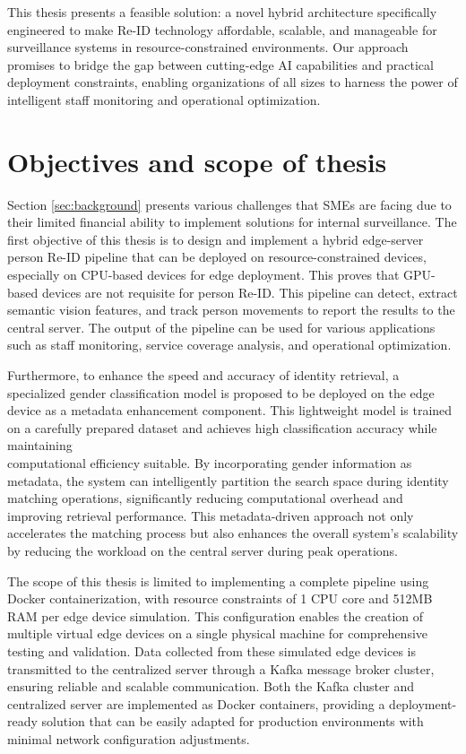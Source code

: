\documentclass[../main.tex]{subfiles}
\begin{document}
This thesis presents a feasible solution: a novel hybrid architecture specifically engineered to make Re-ID technology affordable, scalable, and manageable for surveillance systems in resource-constrained environments. Our approach promises to bridge the gap between cutting-edge AI capabilities and practical deployment constraints, enabling organizations of all sizes to harness the power of intelligent staff monitoring and operational optimization.

\section{Objectives and scope of thesis} 
\label{sec:objectives}

Section \ref{sec:background} presents various challenges that SMEs are facing due to their limited financial ability to implement solutions for internal surveillance. The first objective of this thesis is to design and implement a hybrid edge-server person Re-ID pipeline that can be deployed on resource-constrained devices, especially on CPU-based devices for edge deployment. This proves that GPU-based devices are not requisite for person Re-ID. This pipeline can detect, extract semantic vision features, and track person movements to report the results to the central server. The output of the pipeline can be used for various applications such as staff monitoring, service coverage analysis, and operational optimization.

Furthermore, to enhance the speed and accuracy of identity retrieval, a specialized gender classification model is proposed to be deployed on the edge device as a metadata enhancement component. This lightweight model is trained on a carefully prepared dataset and achieves high classification accuracy while maintaining\\ computational efficiency suitable. By incorporating gender information as metadata, the system can intelligently partition the search space during identity matching operations, significantly reducing computational overhead and improving retrieval performance. This metadata-driven approach not only accelerates the matching process but also enhances the overall system's scalability by reducing the workload on the central server during peak operations.

The scope of this thesis is limited to implementing a complete pipeline using Docker containerization, with resource constraints of 1 CPU core and 512MB RAM per edge device simulation. This configuration enables the creation of multiple virtual edge devices on a single physical machine for comprehensive testing and validation. Data collected from these simulated edge devices is transmitted to the centralized server through a Kafka message broker cluster, ensuring reliable and scalable communication. Both the Kafka cluster and centralized server are implemented as Docker containers, providing a deployment-ready solution that can be easily adapted for production environments with minimal network configuration adjustments.
\end{document}
